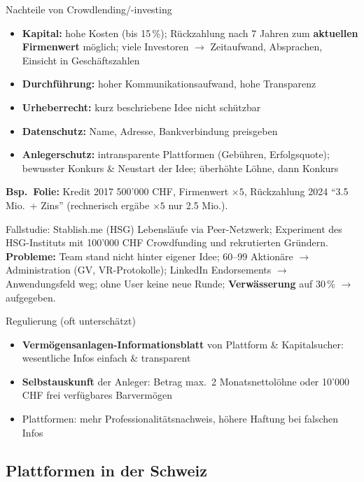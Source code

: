 \documentclass[a4paper, fontsize=7pt]{scrartcl}
\begin{document}
\begin{mainbox}{Nachteile von Crowdlending/-investing}
\begin{itemize}
    \item \textbf{Kapital:} hohe Kosten (bis 15\,\%); Rückzahlung nach 7 Jahren
    zum \textbf{aktuellen Firmenwert} möglich; viele Investoren $\to$
    Zeitaufwand, Absprachen, Einsicht in Geschäftszahlen
    \item \textbf{Durchführung:} hoher Kommunikationsaufwand, hohe Transparenz
    \item \textbf{Urheberrecht:} kurz beschriebene Idee nicht schützbar
    \item \textbf{Datenschutz:} Name, Adresse, Bankverbindung preisgeben
    \item \textbf{Anlegerschutz:} intransparente Plattformen (Gebühren,
    Erfolgsquote); bewusster Konkurs \& Neustart der Idee; überhöhte Löhne,
    dann Konkurs
\end{itemize}
\textbf{Bsp.\ Folie:} Kredit 2017 500'000 CHF, Firmenwert $\times 5$,
Rückzahlung 2024 ``3.5 Mio.\ + Zins'' (rechnerisch ergäbe $\times 5$ nur 2.5
Mio.).
\end{mainbox}

\begin{subbox}{Fallstudie: Stablish.me (HSG)}
Lebensläufe via Peer-Netzwerk; Experiment des HSG-Instituts mit 100'000 CHF
Crowdfunding und rekrutierten Gründern. \textbf{Probleme:} Team stand nicht
hinter eigener Idee; 60--99 Aktionäre $\to$ Administration (GV, VR-Protokolle);
LinkedIn Endorsements $\to$ Anwendungsfeld weg; ohne User keine neue Runde;
\textbf{Verwässerung} auf 30\,\% $\to$ aufgegeben.
\end{subbox}

\begin{mainbox}{Regulierung (oft unterschätzt)}
\begin{itemize}
    \item \textbf{Vermögensanlagen-Informationsblatt} von Plattform \&
    Kapitalsucher: wesentliche Infos einfach \& transparent
    \item \textbf{Selbstauskunft} der Anleger: Betrag max.\ 2 Monatsnettolöhne
    oder 10'000 CHF frei verfügbares Barvermögen
    \item Plattformen: mehr Professionalitätsnachweis, höhere Haftung bei
    falschen Infos
\end{itemize}
\end{mainbox}

\subsection{Plattformen in der Schweiz}
\end{document}
